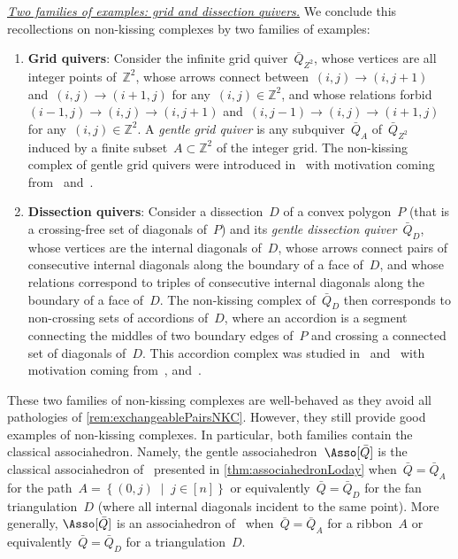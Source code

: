 \documentclass{amsart}
\theoremstyle{definition}
\newcommand{\Z}{\mathbb{Z}} %
\newcommand{\set}[2]{\left\{ #1 \;\middle|\; #2 \right\}} %
\newcommand{\darkblue}{\color{darkblue}} %
\newcommand{\defn}[1]{\textsl{\darkblue #1}} %
\newcommand{\para}[1]{\medskip\noindent\uline{\textit{#1.}}} %
\newcommand{\vincent}[1]{\todo[color=blue!30]{#1 \\ \hfill --- V.}}
\newcommand{\quiver}{\bar Q} %
\begin{document}
\para{Two families of examples: grid and dissection quivers}
%
We conclude this recollections on non-kissing complexes by two families of examples:
\begin{enumerate}[(1)]
\item \textbf{Grid quivers}: Consider the infinite grid quiver~$\quiver_{Z^2}$, whose vertices are all integer points of~$\Z^2$, whose arrows connect between~$(i,j) \longrightarrow (i,j+1)$ and~$(i,j) \longrightarrow (i+1,j)$ for any~$(i,j) \in \Z^2$, and whose relations forbid~$(i-1,j) \longrightarrow (i,j) \longrightarrow (i,j+1)$ and~$(i,j-1) \longrightarrow (i,j) \longrightarrow (i+1,j)$ for any~$(i,j) \in \Z^2$. A \defn{gentle grid quiver} is any subquiver~$\quiver_A$ of~$\quiver_{Z^2}$ induced by a finite subset~$A \subset \Z^2$ of the integer grid. The non-kissing complex of gentle grid quivers were introduced in~\cite{McConville} with motivation coming from~\cite{PetersenPylyavskyySpeyer} and~\cite{SantosStumpWelker}. 

\smallskip
\item \textbf{Dissection quivers}: Consider a dissection~$D$ of a convex polygon~$P$ (that is a crossing-free set of diagonals of~$P$) and its \defn{gentle dissection quiver}~$\quiver_D$, whose vertices are the internal diagonals of~$D$, whose arrows connect pairs of consecutive internal diagonals along the boundary of a face of~$D$, and whose relations correspond to triples of consecutive internal diagonals along the boundary of a face of~$D$. The non-kissing complex of~$\quiver_D$ then corresponds to non-crossing sets of accordions of~$D$, where an accordion is a segment connecting the middles of two boundary edges of~$P$ and crossing a connected set of diagonals of~$D$. This accordion complex was studied in~\cite{GarverMcConville} and~\cite{MannevillePilaud-accordion} with motivation coming from~\cite{Baryshnikov}, and~\cite{Chapoton-quadrangulations}.
\end{enumerate}

\vincent{Example picture?}

\smallskip
These two families of non-kissing complexes are well-behaved as they avoid all pathologies of \cref{rem:exchangeablePairsNKC}.
However, they still provide good examples of non-kissing complexes.
In particular, both families contain the classical associahedron.
Namely, the gentle associahedron~$\Asso[\quiver]$ is the classical associahedron of~\cite{ShniderSternberg, Loday} presented in \cref{thm:associahedronLoday} when~${\quiver = \quiver_A}$ for the path~${A = \set{(0,j)}{j \in [n]}}$ or equivalently~$\quiver = \quiver_D$ for the fan triangulation~$D$ (where all internal diagonals incident to the same point).
More generally, $\Asso[\quiver]$ is an associahedron of~\cite{HohlwegLange} when~$\quiver = \quiver_A$ for a ribbon~$A$ or equivalently~$\quiver = \quiver_D$ for a triangulation~$D$.
\end{document}
